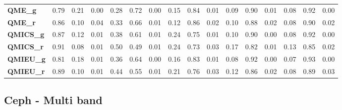 \begin{anexo}
\begin{table}
{\begin{tabular}{lrrrrrrrrrrrrrrr}
\textbf{QME\_g  } &        0.79 &  0.21 &     0.00 &        0.28 &  0.72 &     0.00 &        0.15 &  0.84 &     0.01 &        0.09 &  0.90 &     0.01 &        0.08 &  0.92 &     0.00 \\
\textbf{QME\_r  } &        0.86 &  0.10 &     0.04 &        0.33 &  0.66 &     0.01 &        0.12 &  0.86 &     0.02 &        0.10 &  0.88 &     0.02 &        0.08 &  0.90 &     0.02 \\
\textbf{QMICS\_g} &        0.87 &  0.12 &     0.01 &        0.38 &  0.61 &     0.01 &        0.24 &  0.75 &     0.01 &        0.10 &  0.90 &     0.00 &        0.08 &  0.92 &     0.00 \\
\textbf{QMICS\_r} &        0.91 &  0.08 &     0.01 &        0.50 &  0.49 &     0.01 &        0.24 &  0.73 &     0.03 &        0.17 &  0.82 &     0.01 &        0.13 &  0.85 &     0.02 \\
\textbf{QMIEU\_g} &        0.81 &  0.18 &     0.01 &        0.36 &  0.64 &     0.00 &        0.16 &  0.83 &     0.01 &        0.08 &  0.92 &     0.00 &        0.07 &  0.93 &     0.00 \\
\textbf{QMIEU\_r} &        0.89 &  0.10 &     0.01 &        0.44 &  0.55 &     0.01 &        0.21 &  0.76 &     0.03 &        0.12 &  0.86 &     0.02 &        0.08 &  0.89 &     0.03 \\
\bottomrule
\end{tabular}}
\end{table}    
    
    \subsection{Ceph - Multi band}
    
\begin{table}
\centering
\caption{Resumen de resultados Ceph multi band.}
\label{anexo:Cephmb}
\end{table}    
    

\end{anexo}
